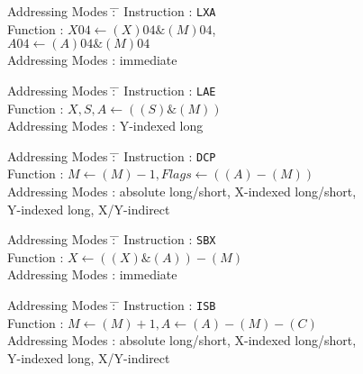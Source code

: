 \documentclass[12pt,twoside]{report}
\newcommand{\tty}[1]{{\tt #1}}
\begin{document}
\begin{tabbing}
Addressing Modes \= : \= \kill 
Instruction      \> : \> \tty{LXA} \\
Function         \> : \> $X{04}\leftarrow(X){04}\&(M){04}$, \\
                 \>   \> $A{04}\leftarrow(A){04}\&(M){04}$ \\
Addressing Modes \> : \> immediate \\
\end{tabbing}

\begin{tabbing}
Addressing Modes \= : \= \kill 
Instruction      \> : \> \tty{LAE} \\
Function         \> : \> $X,S,A\leftarrow((S)\&(M))$ \\
Addressing Modes \> : \> Y-indexed long \\
\end{tabbing}

\begin{tabbing}
Addressing Modes \= : \= \kill 
Instruction      \> : \> \tty{DCP} \\
Function         \> : \> $M\leftarrow(M)-1, Flags\leftarrow((A)-(M))$ \\
Addressing Modes \> : \> absolute long/short, X-indexed long/short, \\
                 \>   \> Y-indexed long, X/Y-indirect \\
\end{tabbing}

\begin{tabbing}
Addressing Modes \= : \= \kill 
Instruction      \> : \> \tty{SBX} \\
Function         \> : \> $X\leftarrow((X)\&(A))-(M)$ \\
Addressing Modes \> : \> immediate \\
\end{tabbing}

\begin{tabbing}
Addressing Modes \= : \= \kill 
Instruction      \> : \> \tty{ISB} \\
Function         \> : \> $M\leftarrow(M)+1, A\leftarrow(A)-(M)-(C)$ \\
Addressing Modes \> : \> absolute long/short, X-indexed long/short, \\
                 \>   \> Y-indexed long, X/Y-indirect \\
\end{tabbing}

\end{document}
